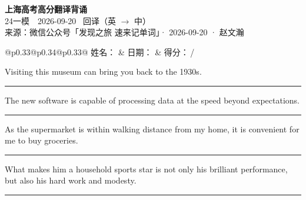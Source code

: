 \documentclass[11pt,a4paper]{article}
\newcommand{\num}[1]{\makebox[1.9em][r]{#1.}\hspace{0.3em}}
\newcommand{\wline}{\noindent\rule{\linewidth}{0.4pt}}
\begin{document}
\pagestyle{plain}
\begin{center}
{\LARGE\bfseries 上海高考高分翻译背诵 }\\[0.25em]
{\large 24一模　2026-09-20 \quad\ 回译（英 $\to$ 中）}\\[0.35em]
{\footnotesize 来源：微信公众号「发现之旅 速来记单词」· 2026-09-20 · 赵文瀚}
\end{center}

\vspace{0.4em}
\noindent\begin{tabular}{@{}p{0.33\textwidth}@{}p{0.34\textwidth}@{}p{0.33\textwidth}@{}}
姓名：\underline{\hspace{2.0cm}} & 日期：\underline{\hspace{2.0cm}} & 得分：\underline{\hspace{1.4cm}}\,/ \\
\end{tabular}

\vspace{0.5em}

\vspace{0.8em}
\num{1}Visiting this museum can bring you back to the 1930s.

\vspace{0.25em}

\wline

\num{2}The new software is capable of processing data at the speed beyond expectations.

\vspace{0.25em}

\wline

\num{3}As the supermarket is within walking distance from my home, it is convenient for me to buy groceries.

\vspace{0.25em}

\wline

\num{4}What makes him a household sports star is not only his brilliant performance, but also his hard work and modesty.

\vspace{0.25em}

\wline
\end{document}
